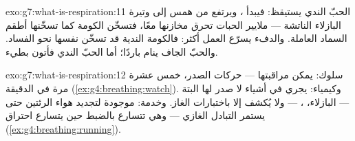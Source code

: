\begin{solution}{exo:g7:what-is-respiration:11}
الحبّ الندي يستيقظ: فيبدأ ، ويرتفع  من همس إلى وتيرة
البازلاء الناتشة --- ملايير الحبات تحرق مخازنها معًا، فتسخّن
الكومة كما تسخّنها أطقم السماد العاملة. والدفء يسرّع العمل أكثر:
فالكومة الندية قد تسخّن نفسها نحو الفساد. والحبّ الجاف ينام باردًا؛
أما الحبّ الندي فأتون بطيء.
\end{solution}

\begin{solution}{exo:g7:what-is-respiration:12}
سلوك:  يمكن مراقبتها --- حركات الصدر، خمس عشرة مرة
في الدقيقة (\cref{ex:g4:breathing:watch}). وكيمياء:  يجري في
أشياء لا صدر لها البتة --- البازلاء، ،  --- ولا
يُكشف إلا باختبارات الغاز. وخدمة:  موجودة لتجديد
هواء الرئتين حتى يستمر التبادل الغازي --- وهي تتسارع بالضبط حين
يتسارع احتراق 
(\cref{ex:g4:breathing:running}).
\end{solution}

